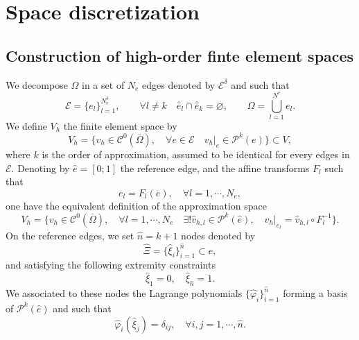 \documentclass[11pt,a4paper]{article}
\begin{document}
\section{Space discretization}
\subsection{Construction of high-order finte element spaces}
We decompose $\Omega$ in a set of $N_e$ edges denoted by $\mathcal{E}^\delta$ and such that
\begin{equation*}
\mathcal{E} = \{e_l\}_{l=1}^{N^\delta_e}, \quad\quad \forall l\neq k\quad \overset{\circ}{e}_l \cap \overset{\circ}{e}_k = \varnothing, \quad\quad \Omega = \bigcup_{l=1}^{N^e}e_l.
\end{equation*}
We define $V_h$ the finite element space by
\begin{equation*}
V_h = \big\{ v_h \in \mathcal{C}^0(\overline{\Omega}), \quad\forall e \in \mathcal{E} \quad v_h|_{e} \in \mathcal{P}^k(e) \big\} \subset V,
\end{equation*}
where $k$ is the order of approximation, assumed to be identical for every edges in $\mathcal{E}$. Denoting by $\widehat{e} = [0; 1]$ the reference edge, and the affine transforms $F_l$ such that
\begin{equation*}
e_l = F_l(\widehat{e}), \quad \forall l=1,\cdots, N_e,
\end{equation*}
one have the equivalent definition of the approximation space
\begin{equation*}
V_h = \big\{ v_h \in \mathcal{C}^0(\overline{\Omega}), \quad\forall l=1,\cdots,N_e\quad  \exists! \widehat{v}_{h, l} \in \mathcal{P}^k(\widehat{e}), \quad v_h|_{e_l} = \widehat{v}_{h, l} \circ  F_l^{-1} \big\}.
\end{equation*}
On the reference edges, we set $\widehat{n}=k+1$ nodes denoted by
\begin{equation*}
\widehat{\Xi} = \{\widehat{\xi}_i\}_{i=1}^{\widehat{n}} \subset \widehat{e},
\end{equation*}
and satisfying the following extremity constraints
\begin{equation*}
\widehat{\xi}_1 = 0, \quad \widehat{\xi}_{\widehat{n}} = 1.
\end{equation*}
We associated to these nodes the Lagrange polynomials $\{\widehat{\varphi}_i\}_{i=1}^{\widehat{n}}$ forming a basis of  $\mathcal{P}^k(\widehat{e})$ and such that
\begin{equation*}
\widehat{\varphi}_i(\widehat{\xi}_j) = \delta_{ij}, \quad \forall i,j=1, \cdots, \widehat{n}.
\end{equation*}
\end{document}
